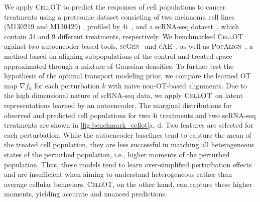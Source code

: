  We apply \textsc{CellOT} to predict the responses of cell populations to cancer treatments using a proteomic dataset consisting of two melanoma cell lines (M130219 and M130429) \citep{raaijmakers2015new}, profiled by 4i~\citep{gut2018multiplexed}, and a scRNA-seq dataset~\citep{srivatsan2020massively}, which contain 34 and 9 different treatments, respectively.
We benchmarked \textsc{CellOT} against two autoencoder-based tools, \textsc{scGen}~\citep{lotfollahi2019scgen} and \textsc{cAE}~\citep{lopez2018scvi}, as well as \textsc{PopAlign}~\citep{chen2020dissecting}, a method based on aligning subpopulations of the control and treated space approximated through a mixture of Gaussian densities.
To further test the hypothesis of the optimal transport modeling prior, we compare the learned OT map $\nabla f_k$ for each perturbation $k$ with naive non-OT-based alignments.
Due to the high dimensional nature of scRNA-seq data, we apply $\textsc{CellOT}$ on latent representations learned by an autoencoder.
The marginal distributions for observed and predicted cell populations for two 4i treatments and two scRNA-seq treatments are shown in \cref{fig:benchmark_cellot}a, d. 
Two features are selected for each perturbation.
While the autoencoder baselines tend to capture the mean of the treated cell population, they are less successful in matching all heterogeneous states of the perturbed population, i.e., higher moments of the perturbed population.
Thus, these models tend to learn over-simplified perturbation effects and are insufficient when aiming to understand heterogeneous rather than average cellular behaviors.
\textsc{CellOT}, on the other hand, can capture these higher moments, yielding accurate and nuanced predictions.

